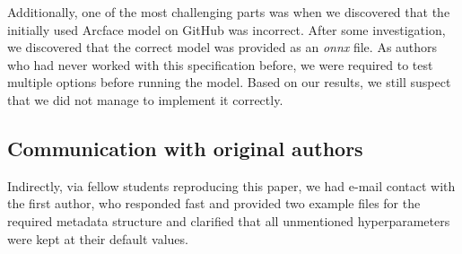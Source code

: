Additionally, one of the most challenging parts was when we discovered that the initially used Arcface model on GitHub was incorrect. After some investigation, we discovered that the correct model was provided as an \textit{onnx} file. 
As authors who had never worked with this specification before, we were required to test multiple options before running the model.
Based on our results, we still suspect that we did not manage to implement it correctly. 


\subsection{Communication with original authors}

Indirectly, via fellow students reproducing this paper, we had e-mail contact with the first author, who responded fast and provided two example files for the required metadata structure and clarified that all unmentioned hyperparameters were kept at their default values.

